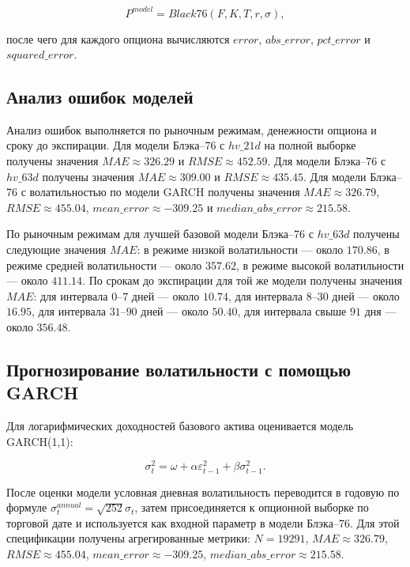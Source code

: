 \documentclass[11pt,a4paper]{article}
\begin{document}
\begin{equation}
P^{model} = Black76(F, K, T, r, \sigma),
\end{equation}

после чего для каждого опциона вычисляются $error$, $abs\_error$, $pct\_error$ и $squared\_error$.

\subsection{Анализ ошибок моделей}

Анализ ошибок выполняется по рыночным режимам, денежности опциона и сроку до экспирации. Для модели Блэка--76 с $hv\_21d$ на полной выборке получены значения $MAE \approx 326.29$ и $RMSE \approx 452.59$. Для модели Блэка--76 с $hv\_63d$ получены значения $MAE \approx 309.00$ и $RMSE \approx 435.45$. Для модели Блэка--76 с волатильностью по модели GARCH получены значения $MAE \approx 326.79$, $RMSE \approx 455.04$, $mean\_error \approx -309.25$ и $median\_abs\_error \approx 215.58$.

По рыночным режимам для лучшей базовой модели Блэка--76 с $hv\_63d$ получены следующие значения $MAE$: в режиме низкой волатильности --- около $170.86$, в режиме средней волатильности --- около $357.62$, в режиме высокой волатильности --- около $411.14$. По срокам до экспирации для той же модели получены значения $MAE$: для интервала $0$--$7$ дней --- около $10.74$, для интервала $8$--$30$ дней --- около $16.95$, для интервала $31$--$90$ дней --- около $50.40$, для интервала свыше $91$ дня --- около $356.48$.

\subsection{Прогнозирование волатильности с помощью GARCH}

Для логарифмических доходностей базового актива оценивается модель GARCH(1,1):

\begin{equation}
\sigma_t^2 =
\omega
+
\alpha \varepsilon_{t-1}^2
+
\beta \sigma_{t-1}^2.
\end{equation}

После оценки модели условная дневная волатильность переводится в годовую по формуле $\sigma^{annual}_t = \sqrt{252}\sigma_t$, затем присоединяется к опционной выборке по торговой дате и используется как входной параметр в модели Блэка--76. Для этой спецификации получены агрегированные метрики: $N = 19291$, $MAE \approx 326.79$, $RMSE \approx 455.04$, $mean\_error \approx -309.25$, $median\_abs\_error \approx 215.58$.
\end{document}
